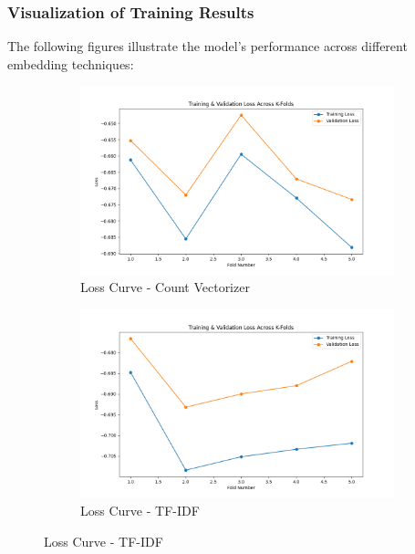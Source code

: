 \subsubsection{Visualization of Training Results}

The following figures illustrate the model’s performance across different embedding techniques:

\begin{figure}[H]
    \centering
    \begin{subfigure}[b]{0.48\textwidth}
        \includegraphics[width=\textwidth]{img/report_info/img/2.1.Perceptron/best_perceptron_count_loss.png}
        \caption{Loss Curve - Count Vectorizer}
        \label{fig:perc-count-loss}
    \end{subfigure}
    \begin{subfigure}[b]{0.48\textwidth}
        \includegraphics[width=\textwidth]{img/report_info/img/2.1.Perceptron/best_perceptron_tfidf_loss.png}
        \caption{Loss Curve - TF-IDF}
        \label{fig:perc-tfidf-loss}
    \end{subfigure}
    

\end{figure}
